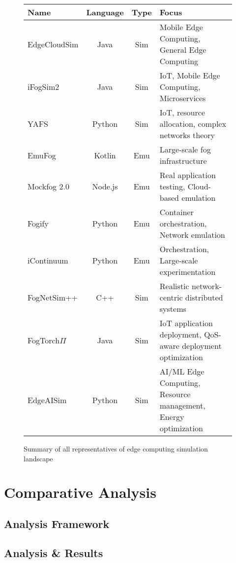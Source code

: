 \begin{figure}[H]
  \centering
  \begin{tabularx}{\textwidth}{l | c | c | X }
    \hline
    \textbf{Name} & \textbf{Language} & \textbf{Type} & \textbf{Focus} \\\hline
    EdgeCloudSim  & Java & Sim & Mobile Edge Computing, General Edge Computing\\\hline
    iFogSim2      & Java & Sim & IoT, Mobile Edge Computing, Microservices\\\hline
    YAFS          & Python & Sim & IoT, resource allocation, complex networks theory\\\hline
    EmuFog        & Kotlin & Emu & Large-scale fog infrastructure\\\hline
    Mockfog 2.0   & Node.js & Emu & Real application testing, Cloud-based emulation\\\hline
    Fogify        & Python & Emu & Container orchestration, Network emulation\\\hline
    iContinuum    & Python & Emu & Orchestration, Large-scale experimentation\\\hline
    FogNetSim++   & C++ & Sim & Realistic network-centric distributed systems\\\hline
    FogTorch$\Pi$ & Java & Sim & IoT application deployment, QoS-aware deployment optimization\\\hline
    EdgeAISim     & Python & Sim & AI/ML Edge Computing, Resource management, Energy optimization\\\hline
  \end{tabularx}
  \caption{Summary of all representatives of edge computing simulation landscape}
  \label{tab:overview-table-representatives}
\end{figure}

\section{Comparative Analysis}
\subsection{Analysis Framework}
\subsection{Analysis \& Results}
